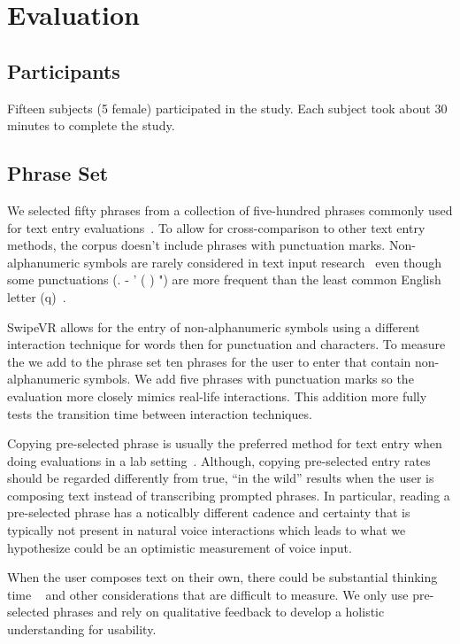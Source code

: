 \section{Evaluation}
\subsection{Participants}
Fifteen subjects (5 female) participated in the study.
Each subject took about 30 minutes to complete the study.

\subsection{Phrase Set}
We selected fifty phrases from a collection of five-hundred phrases commonly used for text entry evaluations~\cite{mackenzie2003phrase}.
To allow for cross-comparison to other text entry methods, the corpus doesn't include phrases with punctuation marks.
Non-alphanumeric symbols are rarely considered in text input research~\cite{mackenzie2003phrase} even though some punctuations (. - ' ( ) ") are more frequent than the least common English letter (q)~\cite{malikpunctuation}.
 
SwipeVR allows for the entry of non-alphanumeric symbols using a different interaction technique for words then for punctuation and characters.
To measure the  we add to the phrase set ten phrases for the user to enter that contain non-alphanumeric symbols.
We add five phrases with punctuation marks so the evaluation more closely mimics real-life interactions.
This addition more fully tests the transition time between interaction techniques. 

Copying pre-selected phrase is usually the preferred method for text entry when doing evaluations in a lab setting~\cite{mackenzie2002character, mackenzie2003phrase}.
Although, copying pre-selected entry rates should be regarded differently from true, ``in the wild'' results when the user is composing text instead of transcribing prompted phrases.
In particular, reading a pre-selected phrase has a noticalbly different cadence and certainty that is typically not present in natural voice interactions which leads to what we hypothesize could be an optimistic measurement of voice input.

When the user composes text on their own, there could be substantial thinking time ~\cite{shneiderman2000limits} and other considerations that are difficult to measure.
We only use pre-selected phrases and rely on qualitative feedback to develop a holistic understanding for usability.

